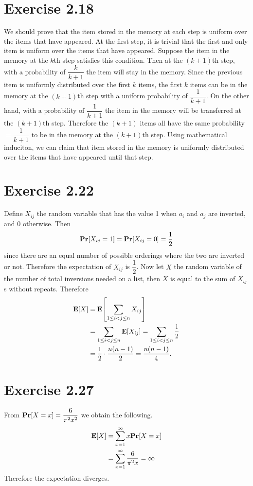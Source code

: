 \documentclass{article}
\begin{document}
\section*{Exercise 2.18}
We should prove that the item stored in the memory at each step is uniform over the items that have appeared.
At the first step, it is trivial that the first and only item is uniform over the items that have appeared.
Suppose the item in the memory at the $k$th step satisfies this condition.
Then at the $(k+1)$th step, with a probability of $\dfrac{k}{k+1}$ the item will stay in the memory.
Since the previous item is uniformly distributed over the first $k$ items, the first $k$ items can be in the memory at the $(k+1)$th step with a uniform probability of $\dfrac{1}{k+1}$.
On the other hand, with a probability of $\dfrac{1}{k+1}$ the item in the memory will be transferred at the $(k+1)$th step.
Therefore the $(k+1)$ items all have the same probability $=\dfrac{1}{k+1}$ to be in the memory at the $(k+1)$th step.
Using mathematical induciton, we can claim that item stored in the memory is uniformly distributed over the items that have appeared until that step.

\section*{Exercise 2.22}
Define $X_{ij}$ the random variable that has the value 1 when $a_i$ and $a_j$ are inverted, and 0 otherwise.
Then $$\mathbf{Pr}\qty[X_{ij}=1] = \mathbf{Pr}\qty[X_{ij}=0] = \frac{1}{2}$$
since there are an equal number of possible orderings where the two are inverted or not.
Therefore the expectation of $X_{ij}$ is $\dfrac{1}{2}$. 
Now let $X$ the random variable of the number of total inversions needed on a list, then $X$ is equal to the sum of $X_{ij}$s without repeats.
Therefore
\begin{align*}
  \mathbf{E}\qty[X] &= \mathbf{E}\qty[\sum_{1 \leq i < j \leq n}X_{ij}] \\
  &= \sum_{1 \leq i < j \leq n}\mathbf{E}\qty[X_{ij}] = \sum_{1 \leq i < j \leq n}\frac{1}{2} \\
  &= \frac{1}{2} \cdot \frac{n(n-1)}{2} = \frac{n(n-1)}{4}.
\end{align*}

\section*{Exercise 2.27}
From $\mathbf{Pr}\qty[X=x] = \dfrac{6}{\pi^2x^2}$ we obtain the following.
\begin{align*}
  \mathbf{E}\qty[X] &= \sum_{x=1}^{\infty}x\mathbf{Pr}\qty[X=x] \\
  &= \sum_{x=1}^{\infty}\frac{6}{\pi^2x} = \infty
\end{align*}
Therefore the expectation diverges.
\end{document}
